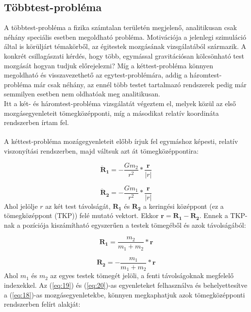 \begin{multicols}{2}
\subsection{Többtest-probléma}
A többtest-probléma a fizika számtalan területén megjelenő, analitikusan csak néhány speciális esetben megoldható probléma. Motivációja a jelenlegi szimuláció által is körüljárt témakörből, az égitestek mozgásának vizsgálatából származik. A konkrét csillagászati kérdés, hogy több, egymással gravitációsan kölcsönható test mozgását hogyan tudjuk előrejelezni? Míg a kéttest-probléma könnyen megoldható és visszavezethető az egytest-problémára, addig a háromtest-probléma már csak néhány, az ennél több testet tartalmazó rendszerek pedig már semmilyen esetben nem oldhatóak meg analitikusan. \\
Itt a két- és háromtest-probléma vizsgálatát végeztem el, melyek közül az első mozgásegyenleteit tömegközépponti, míg a másodikat relatív koordináta rendszerben írtam fel.
\\ \\
A kéttest-probléma mozágegyenleteit előbb írjuk fel egymáshoz képesti, relatív viszonyítási rendszerben, majd váltsuk azt át tömegközéppontira:

\begin{equation} \label{eq:18}
    \boldsymbol{\ddot{R}_{1}}
    =
    - \frac{G m_{2}}{r^{2}} * \frac{\boldsymbol{r}}{\left| r \right|}
\end{equation}

\begin{equation} \label{eq:19}
    \boldsymbol{\ddot{R}_{2}}
    =
    - \frac{G m_{1}}{r^{2}} * \frac{\boldsymbol{r}}{\left| r \right|}
\end{equation}
Ahol jelölje $r$ az két test távolságát, $\boldsymbol{R_{1}}$ és $\boldsymbol{R_{2}}$ a keringési középpont (ez a tömegközéppont (TKP)) felé mutató vektort. Ekkor $\boldsymbol{r} = \boldsymbol{R_{1}} - \boldsymbol{R_{2}}$. Ennek a TKP-nak a pozíciója kiszámítható egyszerűen a testek tömegéből és azok távolságából:

\begin{equation} \label{eq:20}
    \boldsymbol{R_{1}}
    =
    \frac{m_{2}}{m_{1} + m_{2}} * \boldsymbol{r}
\end{equation}

\begin{equation} \label{eq:21}
    \boldsymbol{R_{2}}
    =
    - \frac{m_{1}}{m_{1} + m_{2}} * \boldsymbol{r}
\end{equation}
Ahol $m_{1}$ és $m_{2}$ az egyes testek tömegét jelöli, a fenti távolságoknak megfelelő indexekkel. Az (\ref{eq:19}) és (\ref{eq:20})-as egyenleteket felhasználva és behelyettesítve a (\ref{eq:18})-as mozgásegyenletekbe, könnyen megkaphatjuk azok tömegközépponti rendszerben felírt alakját:


\end{multicols}
